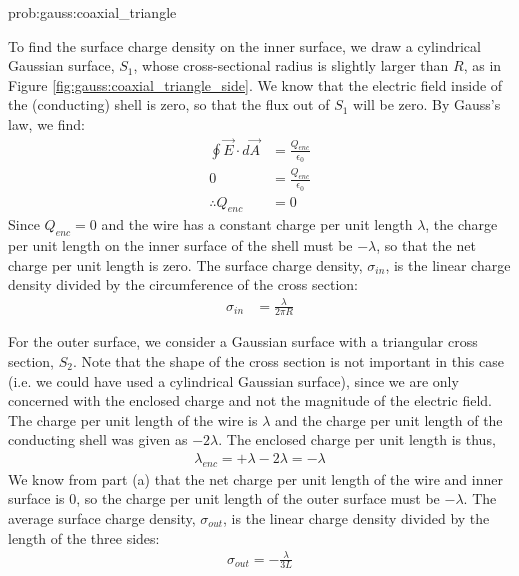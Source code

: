 \begin{solutionParts}{prob:gauss:coaxial_triangle}
{\label{soln:gauss:coaxial_triangle}
\item To find the surface charge density on the inner surface, we draw a cylindrical Gaussian surface, $S_1$, whose cross-sectional radius is slightly larger than $R$, as in Figure \ref{fig:gauss:coaxial_triangle_side}. We know that the electric field inside of the (conducting) shell is zero, so that the flux out of $S_1$ will be zero. By Gauss's law, we find:
\begin{align*}
\oint \vec E \cdot d \vec A &=\frac{Q_{enc}}{\epsilon_0}\\
0 &=\frac{Q_{enc}}{\epsilon_0}\\
\therefore Q_{enc}&=0
\end{align*}
Since $Q_{enc}=0$ and the wire has a constant charge per unit length $\lambda$, the charge per unit length on the inner surface of the shell must be $-\lambda$, so that the net charge per unit length is zero. The surface charge density, $\sigma_{in}$, is the linear charge density divided by the circumference of the cross section:
\begin{align*}
\sigma_{in}&=\frac{\lambda}{2\pi R}
\end{align*}

\item For the outer surface, we consider a Gaussian surface with a triangular cross section, $S_2$. Note that the shape of the cross section is not important in this case (i.e. we could have used a cylindrical Gaussian surface), since we are only concerned with the enclosed charge and not the magnitude of the electric field. \\

The charge per unit length of the wire is $\lambda$ and the charge per unit length of the conducting shell was given as $-2\lambda$. The enclosed charge per unit length is thus,
\begin{align*}
\lambda_{enc}=+\lambda-2\lambda=-\lambda
\end{align*}
We know from part (a) that the net charge per unit length of the wire and inner surface is 0, so the charge per unit length of the outer surface must be $-\lambda$. The average surface charge density, $\sigma_{out}$, is the linear charge density divided by the length of the three sides:
\begin{align*}
\sigma_{out}=-\frac{\lambda}{3L}
\end{align*}
}



\end{solutionParts}


